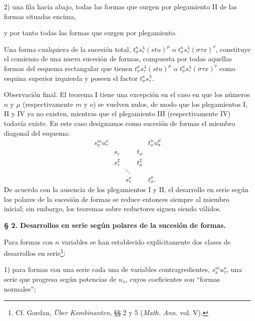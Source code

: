 \documentclass[11pt]{article}
\begin{document}
2) una fila hacia abajo, todas las formas que surgen por plegamiento II de las formas situadas encima,

y por tanto todas las formas que surgen por plegamiento.

Una forma cualquiera de la sucesión total, $t_\sigma^\kappa s_\tau^\lambda(stu)^\mu$ o $t_\sigma^\kappa s_\tau^\lambda(\sigma\tau x)^\nu$, constituye el comienzo de una nueva sucesión de formas, compuesta por todas aquellas formas del esquema rectangular que tienen $t_\sigma^\kappa s_\tau^\lambda(stu)^\mu$ o $t_\sigma^\kappa s_\tau^\lambda(\sigma\tau x)^\nu$ como esquina superior izquierda y poseen el factor $t_\sigma^\kappa s_\tau^\lambda$.

Observación final. El teorema I tiene una excepción en el caso en que los números $n$ y $\mu$ (respectivamente $m$ y $\nu$) se vuelven nulos, de modo que los plegamientos I, II y IV ya no existen, mientras que el plegamiento III (respectivamente IV) todavía existe. En este caso designamos como sucesión de formas el miembro diagonal del esquema:
\[
\begin{array}{ccccc}
s_x^m u_\tau^\nu &&&& t_x^n u_\sigma^\mu\\
& s_\tau && t_\sigma &\\
& s_\tau^2 && t_\sigma^2 &\\
&&\ddots&&\\
&&s_\tau^\nu && t_\sigma^\mu .
\end{array}
\]
De acuerdo con la ausencia de los plegamientos I y II, el desarrollo en serie según las polares de la sucesión de formas se reduce entonces siempre al miembro inicial; sin embargo, los teoremas sobre reductores siguen siendo válidos.

\begin{center}
\textbf{§ 2. \quad Desarrollos en serie según polares de la sucesión de formas.}
\end{center}

Para formas con $n$ variables se han establecido explícitamente dos clases de desarrollos en serie\footnote{Cf. Gordan, \emph{Über Kombinanten}, §§ 2 y 5 (\emph{Math. Ann.} vol. V).}:

1) para formas con una serie cada una de variables contragredientes, $s_x^m u_\tau^\nu$, una serie que progresa según potencias de $u_x$, cuyos coeficientes son ``formas normales'';
\end{document}
